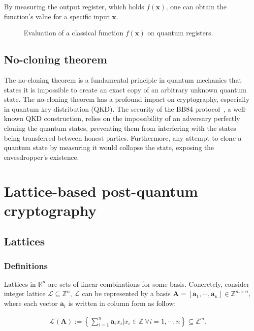 \documentclass[cryptography,review,submit,pdftex,moreauthors,amsmath,amssymb,aps,strict]{Definitions/mdpi}
\newcommand{\peter}[1]{\textcolor{red}{#1}}
\begin{document}
By measuring the output register, which holds $f(\mathbf{x})$, one can obtain the function's value for a specific input $\mathbf{x}$. 
\begin{figure}[!htbp]
    \center
    
    \caption{Evaluation of a classical function $f(\mathbf{x})$ on quantum registers.}
    \label{fig:quantum_parallelism}
\end{figure}



\subsection{No-cloning theorem}

The no-cloning theorem is a fundamental principle in quantum mechanics that states it is impossible to create an exact copy of an arbitrary unknown quantum state. The no-cloning theorem has a profound impact on cryptography, especially in quantum key distribution (QKD). The security of the BB84 protocol~\cite{BB84}, a well-known QKD construction, relies on the impossibility of an adversary perfectly cloning the quantum states, preventing them from interfering with the states being transferred between honest parties. Furthermore, any attempt to clone a quantum state by measuring it would collapse the state, exposing the eavesdropper's existence.


\section{Lattice-based post-quantum cryptography} \label{post-quantum-cryptography-pqc}

\subsection{Lattices}
\subsubsection{Definitions}\label{lattice}
\begin{Definition}
    Lattices in $\mathbb{R}^n$ are sets of linear combinations for some basis. Concretely, consider integer lattice $\mathcal{L}\subseteq \mathbb{Z}^n$, $\mathcal{L}$ can be represented by a basis $\mathbf{A}=[\mathbf{a}_1,\cdots,\mathbf{a}_n]\in\mathbb{Z}^{m\times n}$, where each vector $\mathbf{a}_i$ is written in column form as follow: 

\begin{align}
    \mathcal{L}(\mathbf{A}):=\left\{\sum_{i=1}^n\mathbf{a}_i x_i | x_i\in\mathbb{Z}~\forall i=1,\cdots,n \right\}\subseteq\mathbb{Z}^m.
\end{align}
\end{Definition}
\end{document}
